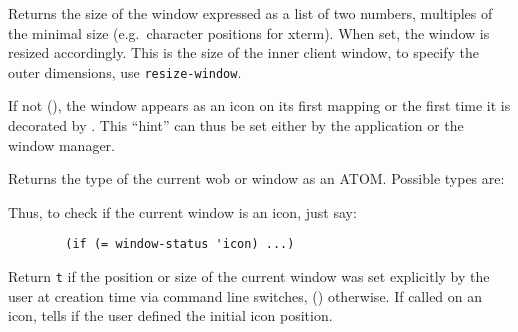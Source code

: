         

Returns the size of the window expressed as a list of two numbers,
multiples of the minimal size (e.g.\ character positions for xterm).  When
set, the window is resized accordingly. This is the size of the inner
client window, to specify the outer dimensions, use \verb"resize-window".

        

If not (), the window appears as an icon on its first mapping or the
first time it is decorated by {\GWM}. This ``hint'' can thus be set either
by the application or the window manager.

        

Returns the type of the current wob or window as an ATOM\@. Possible types
are:


Thus, to check if the current window is an icon, just say:
{\exemplefont\begin{verbatim} 
        (if (= window-status 'icon) ...)
\end{verbatim}}

        

Return \verb"t" if the position or size of the current window was set
explicitly by the user at creation time via command line switches, ()
otherwise. If called on an icon, tells if the user defined the initial icon
position.

        

